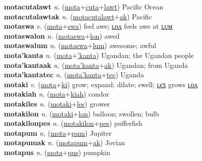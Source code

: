 \textbf{motacutalawt} \textit{n.} (\hyperref[mota]{mota}+\hyperref[cuta]{cuta}+\hyperref[lawt]{lawt})
Pacific Ocean \label{motacutalawt} \\
\textbf{motacutalawtak} \textit{n.} (\hyperref[motacutalawt]{motacutalawt}+\hyperref[ak]{ak})
Pacific \label{motacutalawtak} \\
\textbf{motaswa} \textit{v.} (\hyperref[mota]{mota}+\hyperref[swa]{swa})
feel awe; \hyperref[motaswalon]{ʟᴏᴧ} feels awe at \hyperref[motaswalum]{ʟᴜᴍ} \label{motaswa} \\
\textbf{motaswalon} \textit{n.} (\hyperref[motaswa]{motaswa}+\hyperref[lon]{lon})
awed \label{motaswalon} \\
\textbf{motaswalum} \textit{n.} (\hyperref[motaswa]{motaswa}+\hyperref[lum]{lum})
awesome; awful \label{motaswalum} \\
\textbf{mota'kanta} \textit{n.} (\hyperref[mota]{mota}+\hyperref['kanta]{'kanta})
Ugandan; the Ugandan people \label{mota'kanta} \\
\textbf{mota'kantaak} \textit{n.} (\hyperref[mota'kanta]{mota'kanta}+\hyperref[ak]{ak})
Ugandan; from Uganda \label{mota'kantaak} \\
\textbf{mota'kantatec} \textit{n.} (\hyperref[mota'kanta]{mota'kanta}+\hyperref[tec]{tec})
Uganda \label{mota'kantatec} \\
\textbf{motaki} \textit{v.} (\hyperref[mota]{mota}+\hyperref[ki]{ki})
grow; expand; dilate; swell; \hyperref[motakiles]{ʟєꜱ} grows \hyperref[motakilon]{ʟᴏᴧ} \label{motaki} \\
\textbf{motakiah} \textit{n.} (\hyperref[mota]{mota}+\hyperref[kiah]{kiah})
condor \label{motakiah} \\
\textbf{motakiles} \textit{n.} (\hyperref[motaki]{motaki}+\hyperref[les]{les})
grower \label{motakiles} \\
\textbf{motakilon} \textit{n.} (\hyperref[motaki]{motaki}+\hyperref[lon]{lon})
balloon; swollen; bulb \label{motakilon} \\
\textbf{motakilonpes} \textit{n.} (\hyperref[motakilon]{motakilon}+\hyperref[pes]{pes})
pufferfish \label{motakilonpes} \\
\textbf{motapum} \textit{n.} (\hyperref[mota]{mota}+\hyperref[pum]{pum})
Jupiter \label{motapum} \\
\textbf{motapumak} \textit{n.} (\hyperref[motapum]{motapum}+\hyperref[ak]{ak})
Jovian \label{motapumak} \\
\textbf{motapus} \textit{n.} (\hyperref[mota]{mota}+\hyperref[pus]{pus})
pumpkin \label{motapus} \\
